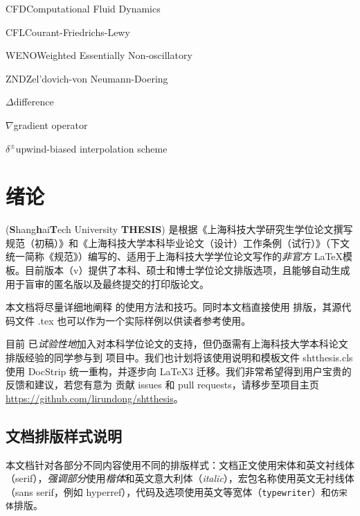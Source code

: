 \documentclass[master]{shtthesis}
\begin{document}
\begin{nomenclatures}[缩写]
  \item{CFD}{Computational Fluid Dynamics}
  \item{CFL}{Courant-Friedrichs-Lewy}
  \item{WENO}{Weighted Essentially Non-oscillatory}
  \item{ZND}{Zel'dovich-von Neumann-Doering}
\end{nomenclatures}

\begin{nomenclatures}[算子 \& 说明]
  \item{$\Delta$}{difference}
  \item{$\nabla$}{gradient operator}
  \item{$\delta^{\pm}$}{upwind-biased interpolation scheme}
\end{nomenclatures}
\fi

\mainmatter

\chapter{绪论} %
\shtthesis{} (\textbf{S}hang\textbf{h}ai\textbf{T}ech University \textbf{THESIS}) 是根据《上海科技大学研究生学位论文撰写规范（初稿）》和《上海科技大学本科毕业论文（设计）工作条例（试行）》（下文统一简称《规范》）编写的、适用于上海科技大学学位论文写作的\emph{非官方} \LaTeX 模板。目前版本（v\version{}）提供了本科、硕士和博士学位论文排版选项，且能够自动生成用于盲审的匿名版以及最终提交的打印版论文。

本文档将尽量详细地阐释 \shtthesis{} 的使用方法和技巧。同时本文档直接使用 \shtthesis{} 排版，其源代码文件 \jobname.tex 也可以作为一个实际样例以供读者参考使用。

目前 \shtthesis{} 已\emph{试验性地}加入对本科学位论文的支持，但仍亟需有上海科技大学本科论文排版经验的同学参与到 \shtthesis{} 项目中。我们也计划将该使用说明和模板文件 shtthesis.cls 使用 \textsf{DocStrip} 统一重构，并逐步向 \LaTeX3 迁移。我们非常希望得到用户宝贵的反馈和建议，若您有意为 \shtthesis{} 贡献 issues 和 pull requests，请移步至项目主页 \url{https://github.com/lirundong/shtthesis}。

\section*{文档排版样式说明}
本文档针对各部分不同内容使用不同的排版样式：文档正文使用宋体和英文衬线体（serif），\emph{强调部分}使用\emph{楷体}和英文意大利体（\emph{italic}），宏包名称使用英文无衬线体（\textsf{sans serif}，例如 \textsf{hyperref}），代码及选项使用英文等宽体（\texttt{typewriter}）和\texttt{仿宋体}排版。
\end{document}
